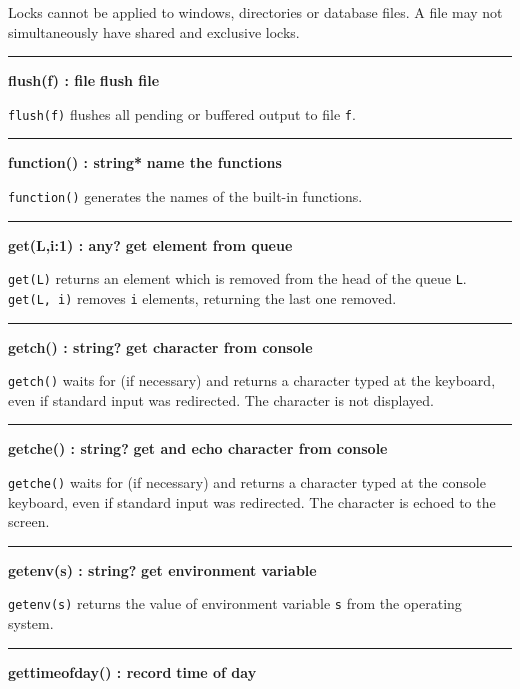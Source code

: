 Locks cannot be applied to windows, directories or database files. A
file may not simultaneously have shared and exclusive locks.

\bigskip\hrule\vspace{0.1cm}
\noindent
{\bf flush(f) : file } \hfill {\bf flush file}

\noindent
{}\texttt{flush(f)} flushes all pending or buffered output
to file \texttt{f}.

\bigskip\hrule\vspace{0.1cm}
\noindent
{\bf function() : string* } \hfill {\bf name the functions}

\noindent
\texttt{function()} generates the names of the built-in functions.

\bigskip\hrule\vspace{0.1cm}
\noindent
{\bf get(L,i:1) : any? } \hfill {\bf get element from queue}\WarningNotThreadSafe

\noindent
\texttt{get(L)} returns an element which is removed from the head of the
queue \texttt{L}. \texttt{get(L, i)} removes \texttt{i}
elements, returning the last one removed.

\bigskip\hrule\vspace{0.1cm}
\noindent
{\bf getch() : string? } \hfill {\bf get character from console}

\noindent
\texttt{getch()} waits for (if necessary) and returns a character typed
at the keyboard, even if standard input was redirected.
The character is not displayed.

\bigskip\hrule\vspace{0.1cm}
\noindent
{\bf getche() : string? } \hfill {\bf get and echo character from console}

\noindent
\texttt{getche()} waits for (if necessary) and returns a character typed
at the console keyboard, even if standard input was redirected. The
character is echoed to the screen.

\bigskip\hrule\vspace{0.1cm}
\noindent
{\bf getenv(s) : string? } \hfill {\bf get environment variable}

\noindent
\texttt{getenv(s)} returns the value of
environment variable \texttt{s}
from the operating system.

\bigskip\hrule\vspace{0.1cm}
\noindent
{\bf gettimeofday() : record } \hfill {\bf time of day}

